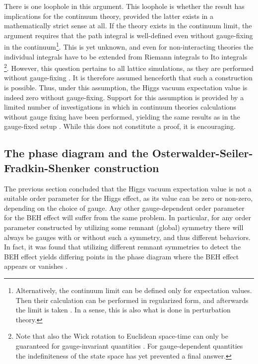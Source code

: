 \documentclass[final,12pt,3p,longtitle]{elsarticle}
\newcommand*{\1}{1\!\!\!\bot}
\begin{document}
There is one loophole in this argument. This loophole is whether the result has implications for the continuum theory, provided the latter exists in a mathematically strict sense at all. If the theory exists in the continuum limit, the argument requires that the path integral is well-defined even without gauge-fixing in the continuum\footnote{Alternatively, the continuum limit can be defined only for expectation values. Then their calculation can be performed in regularized form, and afterwards the limit is taken \cite{Seiler:1982pw}. In a sense, this is also what is done in perturbation theory.}. This is yet unknown, and even for non-interacting theories the individual integrals have to be extended from Riemann integrals to Ito integrals \cite{Rivers:1987hi}\footnote{Note that also the Wick rotation to Euclidean space-time can only be guaranteed for gauge-invariant quantities \cite{Seiler:1982pw}. For gauge-dependent quantities the indefiniteness of the state space has yet prevented a final answer.}. However, this question pertains to all lattice simulations, as they are performed without gauge-fixing \cite{Montvay:1994cy,Gattringer:2010zz,DeGrand:2006zz}. It is therefore assumed henceforth that such a construction is possible. Thus, under this assumption, the Higgs vacuum expectation value is indeed zero without gauge-fixing. Support for this assumption is provided by a limited number of investigations in which in continuum theories calculations without gauge fixing have been performed, yielding the same results as in the gauge-fixed setup \cite{Strocchi:1974xh,Arnone:2005fb,Arnone:2006ie,Rosten:2010vm}. While this does not constitute a proof, it is encouraging.

\subsection{The phase diagram and the Osterwalder-Seiler-Fradkin-Shenker construction}\label{ss:pd}

The previous section concluded that the Higgs vacuum expectation value is not a suitable order parameter for the Higgs effect, as its value can be zero or non-zero, depending on the choice of gauge. Any other gauge-dependent order parameter for the BEH effect will suffer from the same problem. In particular, for any order parameter constructed by utilizing some remnant (global) symmetry there will always be gauges with or without such a symmetry, and thus different behaviors. In fact, it was found that utilizing different remnant symmetries to detect the BEH effect yields differing points in the phase diagram where the BEH effect appears or vanishes \cite{Caudy:2007sf,Greensite:2008ss}.
\end{document}
